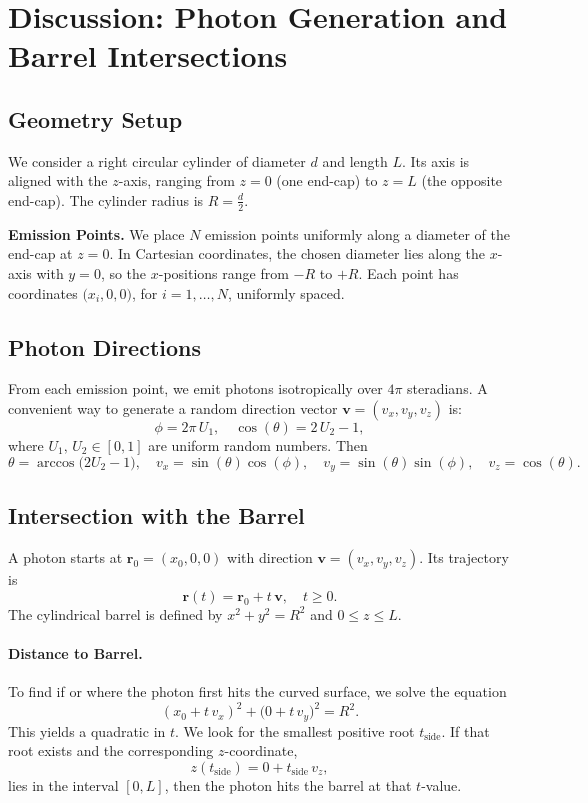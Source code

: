 \documentclass[11pt]{article}
\begin{document}
\section{Discussion: Photon Generation and Barrel Intersections}

\subsection{Geometry Setup}
We consider a right circular cylinder of diameter \(d\) and length \(L\). Its axis is aligned with the \(z\)-axis, ranging from \(z = 0\) (one end-cap) to \(z = L\) (the opposite end-cap). The cylinder radius is \(R = \tfrac{d}{2}\).

\vspace{0.5em}
\noindent
\textbf{Emission Points.} We place \(N\) emission points uniformly along a diameter of the end-cap at \(z = 0\). In Cartesian coordinates, the chosen diameter lies along the \(x\)-axis with \(y = 0\), so the \(x\)-positions range from \(-R\) to \(+R\). Each point has coordinates \(\bigl(x_i, 0, 0\bigr)\), for \(i = 1,\ldots,N\), uniformly spaced.

\subsection{Photon Directions}
From each emission point, we emit photons isotropically over \(4\pi\) steradians. A convenient way to generate a random direction vector 
\(\boldsymbol{v} = (v_x, v_y, v_z)\) is:
\[
\phi = 2\pi \,U_1,\quad \cos(\theta) = 2\,U_2 - 1, 
\]
where \(U_1,\,U_2 \in [0,1]\) are uniform random numbers. Then
\[
\theta = \arccos\bigl(2U_2 - 1\bigr), 
\quad
v_x = \sin(\theta)\cos(\phi), 
\quad
v_y = \sin(\theta)\sin(\phi), 
\quad
v_z = \cos(\theta).
\]

\subsection{Intersection with the Barrel}
A photon starts at \(\mathbf{r}_0 = (x_0,0,0)\) with direction \(\boldsymbol{v}=(v_x,v_y,v_z)\). Its trajectory is 
\[
\mathbf{r}(t) = \mathbf{r}_0 + t\,\boldsymbol{v}, 
\quad t \ge 0.
\]
The cylindrical barrel is defined by \(x^2 + y^2 = R^2\) and \(0 \le z \le L\).

\paragraph{Distance to Barrel.}
To find if or where the photon first hits the curved surface, we solve the equation
\[
(x_0 + t\,v_x)^2 + \bigl(0 + t\,v_y\bigr)^2 = R^2.
\]
This yields a quadratic in \(t\). We look for the smallest positive root \(t_{\mathrm{side}}\). If that root exists and the corresponding \(z\)-coordinate,
\[
z(t_{\mathrm{side}}) = 0 + t_{\mathrm{side}}\,v_z,
\]
lies in the interval \([0, L]\), then the photon hits the barrel at that \(t\)-value.
\end{document}
